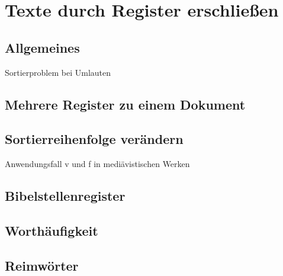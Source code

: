 \chapter{Texte durch Register erschließen}
 

\section{Allgemeines}

Sortierproblem bei Umlauten


\section{Mehrere Register zu einem Dokument}

\cite{voss:einfuehrung}




\section{Sortierreihenfolge verändern}

Anwendungsfall v und f in mediävistischen Werken


\section{Bibelstellenregister}

\label{Bibelstellenregister}

\section{Worthäufigkeit}

\section{Reimwörter}

